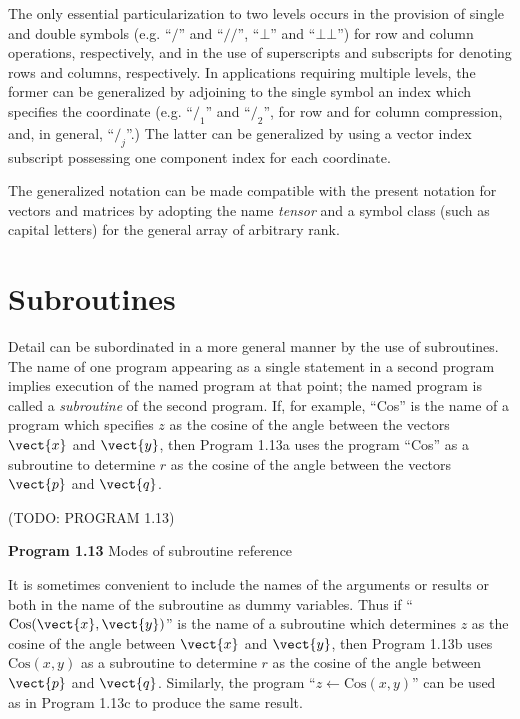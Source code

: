 \par The only essential particularization to two levels occurs in the provision of single and double symbols (e.g. ``$/$'' and ``$/\!/$'', ``$⊥$'' and ``$⊥⊥$'') for row and column operations, respectively, and in the use of superscripts and subscripts for denoting rows and columns, respectively. In applications requiring multiple levels, the former can be generalized by adjoining to the single symbol an index which specifies the coordinate (e.g. ``$/_1$'' and ``$/_2$'', for row and for column compression, and, in general, ``$/_j$''.) The latter can be generalized by using a vector index subscript possessing one component index for each coordinate.

\par The generalized notation can be made compatible with the present notation for vectors and matrices by adopting the name \textit{tensor} and a symbol class (such as capital letters) for the general array of arbitrary rank.

\section{Subroutines}

\par Detail can be subordinated in a more general manner by the use of subroutines. The name of one program appearing as a single statement in a second program implies execution of the named program at that point; the named program is called a \textit{subroutine} of the second program. If, for example, ``Cos'' is the name of a program which specifies $z$ as the cosine of the angle between the vectors $\vect{x}$ and $\vect{y}$, then Program 1.13a uses the program ``Cos'' as a subroutine to determine $r$ as the cosine of the angle between the vectors $\vect{p}$ and $\vect{q}$.

\par (TODO: PROGRAM 1.13)

\par \textbf{Program 1.13} Modes of subroutine reference

\par It is sometimes convenient to include the names of the arguments or results or both in the name of the subroutine as dummy variables. Thus if ``$\text{Cos}(\vect{x}, \vect{y})$'' is the name of a subroutine which determines $z$ as the cosine of the angle between $\vect{x}$ and $\vect{y}$, then Program 1.13b uses $\text{Cos}(x, y)$ as a subroutine to determine $r$ as the cosine of the angle between $\vect{p}$ and $\vect{q}$. Similarly, the program ``$z ← \text{Cos}(x, y)$'' can be used as in Program 1.13c to produce the same result.
